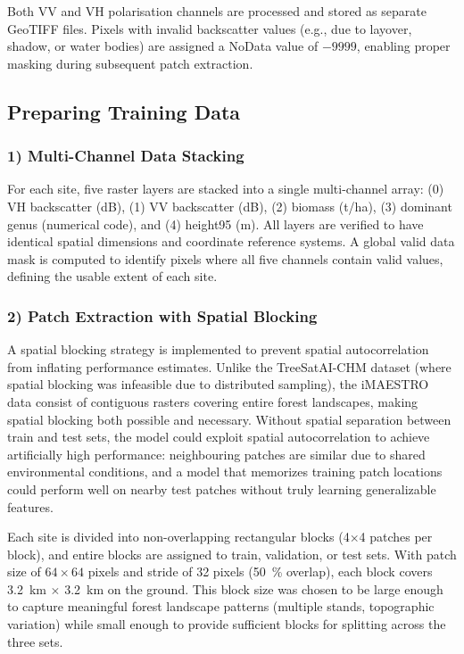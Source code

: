 Both VV and VH polarisation channels are processed and stored as separate GeoTIFF files. Pixels with invalid backscatter values (e.g., due to layover, shadow, or water bodies) are assigned a NoData value of $-9999$, enabling proper masking during subsequent patch extraction.

\subsection{Preparing Training Data}

\subsubsection{1) Multi-Channel Data Stacking}

For each site, five raster layers are stacked into a single multi-channel array: (0) VH backscatter (dB), (1) VV backscatter (dB), (2) biomass (t/ha), (3) dominant genus (numerical code), and (4) height95 (m). All layers are verified to have identical spatial dimensions and coordinate reference systems. A global valid data mask is computed to identify pixels where all five channels contain valid values, defining the usable extent of each site.

\subsubsection{2) Patch Extraction with Spatial Blocking}

A spatial blocking strategy is implemented to prevent spatial autocorrelation from inflating performance estimates. Unlike the TreeSatAI-CHM dataset (where spatial blocking was infeasible due to distributed sampling), the iMAESTRO data consist of contiguous rasters covering entire forest landscapes, making spatial blocking both possible and necessary. Without spatial separation between train and test sets, the model could exploit spatial autocorrelation to achieve artificially high performance: neighbouring patches are similar due to shared environmental conditions, and a model that memorizes training patch locations could perform well on nearby test patches without truly learning generalizable features.

Each site is divided into non-overlapping rectangular blocks (4$\times$4 patches per block), and entire blocks are assigned to train, validation, or test sets. With patch size of $64\times 64$ pixels and stride of 32 pixels (\SI{50}{\percent} overlap), each block covers \SI{3.2}{\kilo\meter} $\times$ \SI{3.2}{\kilo\meter} on the ground. This block size was chosen to be large enough to capture meaningful forest landscape patterns (multiple stands, topographic variation) while small enough to provide sufficient blocks for splitting across the three sets.

